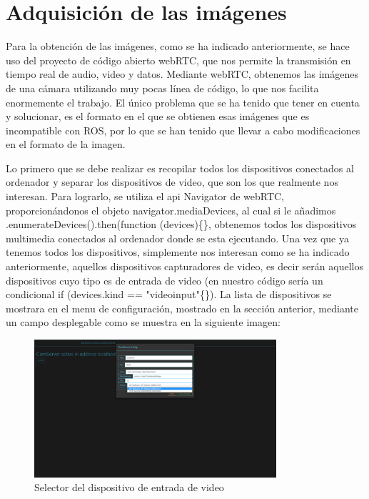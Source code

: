 \section{Adquisición de las imágenes}
Para la obtención de las imágenes, como se ha indicado anteriormente, se hace uso del proyecto de código abierto webRTC, que nos permite la transmisión en tiempo real de audio, video y datos.
Mediante webRTC, obtenemos las imágenes de una cámara utilizando muy pocas línea de código, lo que nos facilita enormemente el trabajo. El único problema que se ha tenido que tener en cuenta y solucionar, es el formato en el que se obtienen esas imágenes que es incompatible con ROS, por lo que se han tenido que llevar a cabo modificaciones en el formato de la imagen.

Lo primero que se debe realizar es recopilar todos los dispositivos conectados al ordenador y separar los dispositivos de video, que son los que realmente nos interesan. Para lograrlo, se utiliza el api Navigator de webRTC, proporcionándonos el objeto navigator.mediaDevices, al cual si le añadimos .enumerateDevices().then(function (devices)\{\}, obtenemos todos los dispositivos multimedia conectados al ordenador donde se esta ejecutando. Una vez que ya tenemos todos los dispositivos, simplemente nos interesan como se ha indicado anteriormente, aquellos dispositivos capturadores de video, es decir serán aquellos dispositivos cuyo tipo es de entrada de video (en nuestro código sería un condicional if (devices.kind == "videoinput"\{\}). La lista de dispositivos se mostrara en el menu de configuración, mostrado en la sección anterior, mediante un campo desplegable como se muestra en la siguiente imagen:
 \begin{figure}[H]
  \begin{center}
    \includegraphics[width=0.8\textwidth]{figures/devicecamserver.png}
		\caption{Selector del dispositivo de entrada de video}
		\label{fig.devicecamserver}
		\end{center}
\end{figure}
